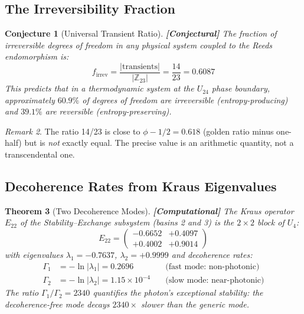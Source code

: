 \documentclass[12pt,a4paper]{article}
\newcommand{\computational}[1]{\textcolor{computational}{\textbf{[Computational]}} #1}
\newcommand{\conjectural}[1]{\textcolor{conjectural}{\textbf{[Conjectural]}} #1}
\newtheorem{theorem}{Theorem}[section]
\newtheorem{conjecture}[theorem]{Conjecture}
\theoremstyle{definition}
\theoremstyle{remark}
\newtheorem{remark}[theorem]{Remark}
\newcommand{\Zp}{\mathbb{Z}_{23}}
\newcommand{\Umix}{U_4}
\begin{document}
\subsection{The Irreversibility Fraction}

\begin{conjecture}[Universal Transient Ratio]
\label{conj:transient}
\conjectural{The fraction of irreversible degrees of freedom in any physical
system coupled to the Reeds endomorphism is:}
\begin{equation}
  f_{\text{irrev}} = \frac{|\text{transients}|}{|\Zp|} = \frac{14}{23} = 0.6087
\end{equation}
This predicts that in a thermodynamic system at the $U_{24}$ phase boundary,
approximately $60.9\%$ of degrees of freedom are irreversible (entropy-producing)
and $39.1\%$ are reversible (entropy-preserving).
\end{conjecture}

\begin{remark}
The ratio 14/23 is close to $\phi - 1/2 = 0.618$ (golden ratio minus one-half)
but is \emph{not} exactly equal. The precise value is an arithmetic quantity, not
a transcendental one.
\end{remark}

\subsection{Decoherence Rates from Kraus Eigenvalues}

\begin{theorem}[Two Decoherence Modes]
\label{thm:decoherence}
\computational{The Kraus operator $E_{22}$ of the Stability--Exchange subsystem
(basins 2 and 3) is the $2 \times 2$ block of $\Umix$:}
\begin{equation}
  E_{22} = \begin{pmatrix}
    -0.6652 & +0.4097 \\
    +0.4002 & +0.9014
  \end{pmatrix}
\end{equation}
with eigenvalues $\lambda_1 = -0.7637$, $\lambda_2 = +0.9999$ and decoherence
rates:
\begin{align}
  \Gamma_1 &= -\ln|\lambda_1| = 0.2696 \quad &\text{(fast mode: non-photonic)} \\
  \Gamma_2 &= -\ln|\lambda_2| = 1.15 \times 10^{-4} \quad &\text{(slow mode: near-photonic)}
\end{align}
The ratio $\Gamma_1/\Gamma_2 = 2340$ quantifies the photon's exceptional
stability: the decoherence-free mode decays $2340\times$ slower than the
generic mode.
\end{theorem}
\end{document}
